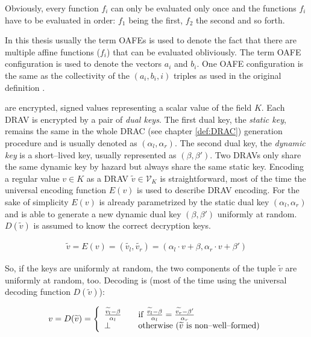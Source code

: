 \noindent{}Obviously, every function $f_i$ can only be evaluated only once and
the functions $f_i$ have to be evaluated in order: $f_1$ being the first, $f_2$
the second and so forth.

In this thesis usually the term OAFEs is used to denote the fact that there are
multiple affine functions ($f_i$) that can be evaluated obliviously. The term
OAFE configuration is used to denote the vectors $a_i$ and $b_i$. One OAFE
configuration is the same as the collectivity of the $(a_i, b_i, i)$ triples as
used in the original definition \cite{davidgoliath}.


%
%
\label{sec:drav}

 are encrypted, signed values
representing a scalar value of the field $K$. Each DRAV is encrypted by a pair
of \emph{dual keys}. The first dual key, the \emph{static key}, remains the same
in the whole DRAC (see chapter \ref{def:DRAC}) generation procedure and is
usually denoted as $(\alpha_l, \alpha_r)$. The second dual key, the
\emph{dynamic key} is a short--lived key, usually represented as $(\beta,
\beta')$. Two DRAVs only share the same dynamic key by hazard but always share
the same static key. Encoding a regular value $v \in K$ as a DRAV
$\widetilde{v} \in \mathcal{V}_K$ is straightforward, most of the time the
universal encoding function $E(v)$ is used to describe DRAV encoding. For the
sake of simplicity $E(v)$ is already parametrized by the static dual key
$(\alpha_l, \alpha_r)$ and is able to generate a new dynamic dual key $(\beta,
\beta')$ uniformly at random. $D(\widetilde{v})$ is assumed to know the correct
decryption keys.

\begin{align*}
  \widetilde{v} = E(v) = (\widetilde{v_l}, \widetilde{v_r}) =
    (\alpha_l \cdot v + \beta, \alpha_r \cdot v + \beta')
\end{align*}

\noindent{}So, if the keys are uniformly at random, the two components of the
tuple $\widetilde{v}$ are uniformly at random, too. Decoding is (most of the
time using the universal decoding function $D(\widetilde{v})$):

\begin{align*}
  v = D(\widetilde{v}) =
  \left\{
    \begin{array}{l l}
      \frac{\widetilde{v_l} - \beta}{\alpha_l} & \quad
      \text{if}~\frac{\widetilde{v_l} - \beta}{\alpha_l} =
      \frac{\widetilde{v_r} - \beta'}{\alpha_r}\\
      \bot & \quad \text{otherwise ($\widetilde{v}$ is non--well--formed)}\\
    \end{array}\right.
\end{align*}

